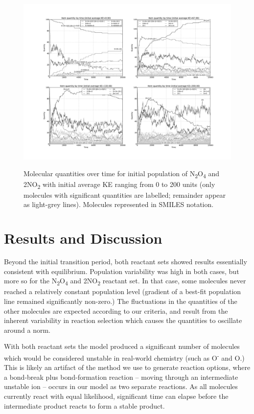 \begin{figure}
	\begin{center}
		\caption{Molecular quantities over time for initial population of N\textsubscript{2}O\textsubscript{4} and 2NO\textsubscript{2} with initial average KE ranging from 0 to 200 units (only molecules with significant quantities are labelled; remainder appear as light-grey lines). Molecules represented in SMILES notation.}
		\includegraphics[width=\linewidth]{figures/results-test-N2O4a}
		\label{fig1}
	\end{center}
\end{figure}

\section{Results and Discussion}\label{results-and-discussion}

Beyond the initial transition period, both reactant sets showed results
essentially consistent with equilibrium. Population variability was high
in both cases, but more so for the N\textsubscript{2}O\textsubscript{4}
and 2NO\textsubscript{2} reactant set. In that case, some molecules
never reached a relatively constant population level (gradient of a
best-fit population line remained significantly non-zero.) The
fluctuations in the quantities of the other molecules are expected
according to our criteria, and result from the inherent variability in
reaction selection which causes the quantities to oscillate around a
norm.

With both reactant sets the model produced a significant number of
molecules which would be considered unstable in real-world chemistry
(such as O\textsuperscript{-} and O.) This is likely an artifact of the method
we use to generate reaction options, where a bond-break plus
bond-formation reaction -- moving through an intermediate unstable
ion -- occurs in our model as two separate reactions. As all molecules
currently react with equal likelihood, significant time can elapse
before the intermediate product reacts to form a stable product.

